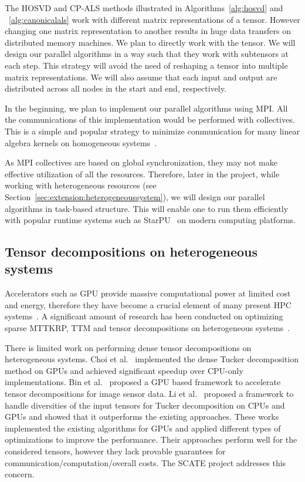 \documentclass[a4paper,11pt]{article}
\newcommand{\todo}[1]{{\color{red}\rule[-.1cm]{.4cm}{.4cm}~~{
			\color{red}{TODO: #1}}}\xspace}
\begin{document}
	The HOSVD and CP-ALS methods illustrated in Algorithms~\ref{alg:hosvd} and ~\ref{alg:canonicalals} work with different matrix representations of a tensor. However changing one matrix representation to another results in huge data transfers on distributed memory machines. We plan to directly work with the tensor. We will design our parallel algorithms in a way such that they work with subtensors at each step. This strategy will avoid the need of reshaping a tensor into multiple matrix representations. We will also assume that each input and output are distributed across all nodes in the start and end, respectively.
	
	In the beginning, we plan to implement our parallel algorithms using MPI. All the communications of this implementation would be performed with collectives. This is a simple and popular strategy to minimize communication for many linear algebra kernels on homogeneous systems~\cite{ABK-IPDPS-2016,BKK-TOMS-2020}.
	
	
	
	As MPI collectives are based on global synchronization, they may not make effective utilization of all the resources. Therefore, later in the project, while working with heterogeneous resources (see Section~\ref{sec:extension:heterogeneoussystem}), we will design our parallel algorithms in task-based structure. This will enable one to run them efficiently with popular runtime systems such as StarPU~\cite{ATNW-CCPE-2011} on modern computing platforms.
	  
	
	
	 
	
	\subsection{Tensor decompositions on heterogeneous systems}
	\label{sec:heterogeneous}
	
	Accelerators such as GPU provide massive computational power at limited cost and energy, therefore they have become a crucial element of many present HPC systems~\cite{top500}. A significant amount of research has been conducted on optimizing sparse MTTKRP, TTM and tensor decompositions on heterogeneous systems~\cite{NLSVS-IPDPS-2019,LWSD-CLUSTER-2017,parti}. 
	
	
	There is limited work on performing dense tensor decompositions on heterogeneous systems. Choi et al.~\cite{CLC-SC-2018} implemented the dense Tucker decomposition method on GPUs and achieved significant speedup over CPU-only implementations. Bin et al.~\cite{BKL-SENSORS-2020} proposed a GPU based framework to accelerate tensor decompositions for image sensor data. Li et al.~\cite{li2020atucker} proposed a framework to handle diversities of the input tensors for Tucker decomposition on CPUs and GPUs and showed that it outperforms the existing approaches. These works implemented the existing algorithms for GPUs and applied different types of optimizations to improve the performance. Their approaches perform well for the considered tensors, however they lack provable guarantees for communication/computation/overall costs. The SCATE project addresses this concern.
	
\end{document}
